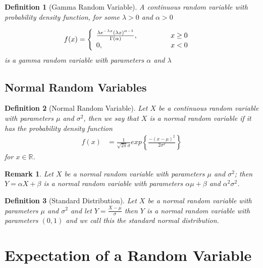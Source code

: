 \documentclass[11pt, oneside]{book}   	%
\newtheorem{definition}{Definition}[chapter]
\newtheorem{remark}{Remark}[chapter]
\begin{document}
\begin{spacing}{1.618}
\begin{definition}[Gamma Random Variable]
	A continuous random variable with probability density function, for some $\lambda > 0$ and $\alpha > 0$ 
	
	\begin{alignat}{4}
		f(x)&=\left\{\begin{array}{lll}
			\frac{\lambda e^{-\lambda x} (\lambda x)^{\alpha-1}}{\Gamma(\alpha)},&\hspace{1 cm}& x\geq 0 \\
			0,&\hspace{1 cm}& x< 0
		\end{array}\right.
	\end{alignat}
	is a \emph{gamma random variable} with parameters $\alpha$ and $\lambda$
\end{definition}

\subsection{Normal Random Variables}

\begin{definition}[Normal Random Variable]
	Let $X$ be a continuous random variable with parameters $\mu$ and $\sigma^2$, then we say that $X$ is a normal random variable if it has the probability density function
	\begin{alignat}{4}
		f(x)&=\frac{1}{\sqrt{2\pi}\sigma}exp\left\{\frac{-(x-\mu)^2}{2\sigma^2}\right\}
	\end{alignat}
	for $x\in\mathbb{R}$. 
\end{definition}

\begin{remark}
	Let $X$ be a normal random variable with parameters $\mu$ and $\sigma^2$; then $Y=\alpha X+\beta$ is a normal random variable with parameters $\alpha\mu+\beta$ and $\alpha^2\sigma^2$. 
\end{remark}

\begin{definition}[Standard Distribution]
	Let $X$ be a normal random variable with parameters $\mu$ and $\sigma^2$ and let $Y=\frac{X-\mu}{\sigma}$ then $Y$ is a normal random variable with parameters $(0, 1)$ and we call this the standard normal distribution. 
\end{definition}

\section{Expectation of a Random Variable}


\end{spacing}
\end{document}
